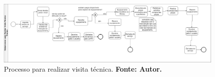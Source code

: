 \begin{landscape}
\graphicspath{{figuras/}}
\begin{figure}[H]
\centering
\includegraphics[width=1.5\textwidth]{subprocesso_to_be}
\caption{Processo para realizar visita técnica. \textbf{Fonte: Autor.}}
\label{subprocesso-to-be}
\end{figure}
\end{landscape} 


